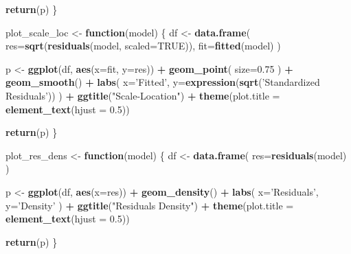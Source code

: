 \documentclass[
  11pt,
]{article}
\newenvironment{Shaded}{\begin{snugshade}}{\end{snugshade}}
\newcommand{\ControlFlowTok}[1]{\textcolor[rgb]{0.13,0.29,0.53}{\textbf{#1}}}
\newcommand{\DataTypeTok}[1]{\textcolor[rgb]{0.13,0.29,0.53}{#1}}
\newcommand{\FloatTok}[1]{\textcolor[rgb]{0.00,0.00,0.81}{#1}}
\newcommand{\KeywordTok}[1]{\textcolor[rgb]{0.13,0.29,0.53}{\textbf{#1}}}
\newcommand{\NormalTok}[1]{#1}
\newcommand{\OperatorTok}[1]{\textcolor[rgb]{0.81,0.36,0.00}{\textbf{#1}}}
\newcommand{\OtherTok}[1]{\textcolor[rgb]{0.56,0.35,0.01}{#1}}
\newcommand{\StringTok}[1]{\textcolor[rgb]{0.31,0.60,0.02}{#1}}
\begin{document}
\begin{Shaded}
\begin{Highlighting}[]
  \KeywordTok{return}\NormalTok{(p)}
\NormalTok{\}}

\NormalTok{plot_scale_loc <-}\StringTok{ }\ControlFlowTok{function}\NormalTok{(model) \{}
\NormalTok{  df <-}\StringTok{ }\KeywordTok{data.frame}\NormalTok{(}
    \DataTypeTok{res=}\KeywordTok{sqrt}\NormalTok{(}\KeywordTok{residuals}\NormalTok{(model, }\DataTypeTok{scaled=}\OtherTok{TRUE}\NormalTok{)),}
    \DataTypeTok{fit=}\KeywordTok{fitted}\NormalTok{(model)}
\NormalTok{  )}
  
\NormalTok{  p <-}\StringTok{ }\KeywordTok{ggplot}\NormalTok{(df, }\KeywordTok{aes}\NormalTok{(}\DataTypeTok{x=}\NormalTok{fit, }\DataTypeTok{y=}\NormalTok{res)) }\OperatorTok{+}
\StringTok{    }\KeywordTok{geom_point}\NormalTok{(}
      \DataTypeTok{size=}\FloatTok{0.75}
\NormalTok{    ) }\OperatorTok{+}
\StringTok{    }\KeywordTok{geom_smooth}\NormalTok{() }\OperatorTok{+}
\StringTok{    }\KeywordTok{labs}\NormalTok{(}
      \DataTypeTok{x=}\StringTok{'Fitted'}\NormalTok{,}
      \DataTypeTok{y=}\KeywordTok{expression}\NormalTok{(}\KeywordTok{sqrt}\NormalTok{(}\StringTok{'Standardized Residuals'}\NormalTok{))}
\NormalTok{    ) }\OperatorTok{+}\StringTok{ }
\StringTok{    }\KeywordTok{ggtitle}\NormalTok{(}\StringTok{"Scale-Location"}\NormalTok{) }\OperatorTok{+}
\StringTok{  }\KeywordTok{theme}\NormalTok{(}\DataTypeTok{plot.title =} \KeywordTok{element_text}\NormalTok{(}\DataTypeTok{hjust =} \FloatTok{0.5}\NormalTok{))}
  
  \KeywordTok{return}\NormalTok{(p)}
\NormalTok{\}}

\NormalTok{plot_res_dens <-}\StringTok{ }\ControlFlowTok{function}\NormalTok{(model) \{}
\NormalTok{  df <-}\StringTok{ }\KeywordTok{data.frame}\NormalTok{(}
    \DataTypeTok{res=}\KeywordTok{residuals}\NormalTok{(model)}
\NormalTok{  )}
  
\NormalTok{  p <-}\StringTok{ }\KeywordTok{ggplot}\NormalTok{(df, }\KeywordTok{aes}\NormalTok{(}\DataTypeTok{x=}\NormalTok{res)) }\OperatorTok{+}
\StringTok{    }\KeywordTok{geom_density}\NormalTok{() }\OperatorTok{+}
\StringTok{    }\KeywordTok{labs}\NormalTok{(}
      \DataTypeTok{x=}\StringTok{'Residuals'}\NormalTok{,}
      \DataTypeTok{y=}\StringTok{'Density'}
\NormalTok{    ) }\OperatorTok{+}
\StringTok{    }\KeywordTok{ggtitle}\NormalTok{(}\StringTok{"Residuals Density"}\NormalTok{) }\OperatorTok{+}
\StringTok{  }\KeywordTok{theme}\NormalTok{(}\DataTypeTok{plot.title =} \KeywordTok{element_text}\NormalTok{(}\DataTypeTok{hjust =} \FloatTok{0.5}\NormalTok{))}
  
  \KeywordTok{return}\NormalTok{(p)}
\NormalTok{\}}


\end{Highlighting}
\end{Shaded}
\end{document}
